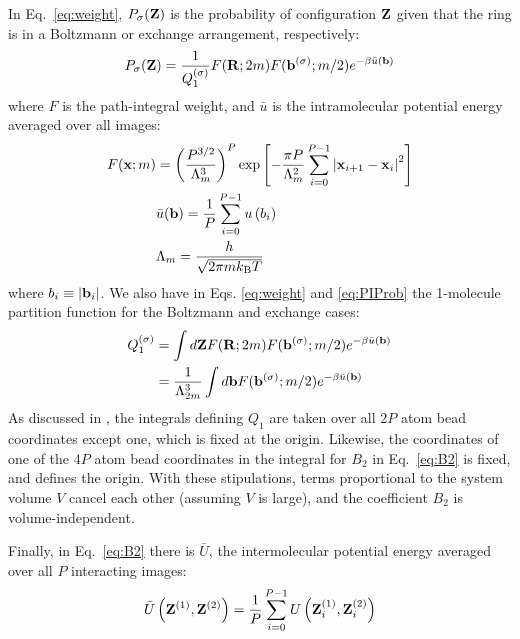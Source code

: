         In Eq.~\ref{eq:weight}, ${P_\sigma}({\mathbf {Z}})$ is the probability of configuration ${\mathbf {Z}}$ given that the ring is in a Boltzmann or exchange arrangement, respectively:
        \begin{equation}
        \label{eq:PIProb}
            P_\sigma ({\mathbf {Z}}) = \frac{1}{Q_1^{{\rm (\sigma)}}} F({\mathbf {R}};2m) F({\mathbf {b}}^{(\sigma)};m/2) e^{ - \beta \bar u({\mathbf {b}})}
        \end{equation}
        where $F$ is the path-integral weight, and $\bar u$ is the intramolecular potential energy averaged over all images:
        \begin{equation}
            \begin{aligned}
                F({\mathbf {x}};m) &= \left( \frac{P^{3/2}} {\Lambda _m^3} \right)^P \exp \left[ - \frac{\pi P}{\Lambda _m^2}\sum\limits_{i = 0}^{P-1} \left| {\mathbf {x}}_{i + 1} - {\mathbf {x}}_i \right|^2 \right]\\
                &\bar u({\mathbf {b}}) = \frac{1}{P}\sum\limits_{i=0}^{P-1} {u\left(b_i \right)} \nonumber\\
                &\Lambda_m=\frac{h}{\sqrt{2\pi m k_{\rm B}T}}\nonumber
            \end{aligned}
        \end{equation}
        where $b_i \equiv \left| {\mathbf {b}}_i \right|$. We also have in Eqs. \ref{eq:weight} and \ref{eq:PIProb} the 1-molecule partition function for the Boltzmann and exchange cases:
        \begin{equation}
        \label{eq:Q1}
            \begin{aligned}
                Q_1^{({\rm \sigma})} &= \int d{\mathbf {Z}} F({\mathbf {R}};2m)F({\mathbf {b}}^{(\sigma)};m/2) e^{ - \beta \bar u({\mathbf {b}})}\nonumber\\
                &=\frac{1}{\Lambda_{2m}^3}\int d{\mathbf {b}}F({\mathbf {b}}^{(\sigma)};m/2) e^{ - \beta \bar u({\mathbf {b}})}
            \end{aligned}
        \end{equation}
        As discussed in \cite{Garberoglio2014}, the integrals defining $Q_1$ are taken over all $2P$ atom bead coordinates except one, which is fixed at the origin. Likewise, the coordinates of one of the $4P$ atom bead coordinates in the integral for $B_2$ in Eq.~\ref{eq:B2} is fixed, and defines the origin. With these stipulations, terms proportional to the system volume $V$ cancel each other (assuming $V$ is large), and the coefficient $B_2$ is volume-independent.

        Finally, in Eq.~\ref{eq:B2} there is $\bar U$, the intermolecular potential energy averaged over all $P$ interacting images:
        \begin{equation}
            \bar U\left( {\mathbf {Z}}^{(1)}, {\mathbf {Z}}^{(2)} \right) = \frac{1}{P}\sum\limits_{i = 0}^{P-1} U\left( {\mathbf {Z}}_i^{(1)},{\mathbf {Z}}_i^{(2)} \right)
        \end{equation}

